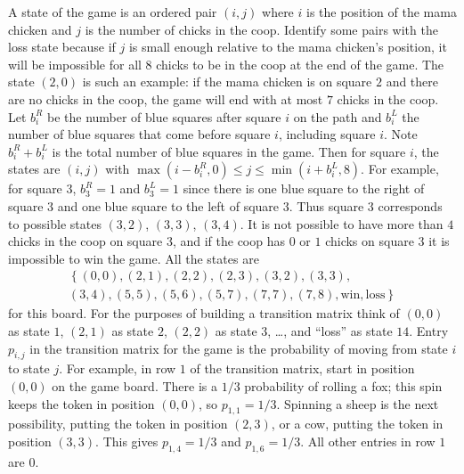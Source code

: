 \documentclass[12pt]{article}
\begin{document}
\begin{example}
    A state of the game is an ordered pair \( (i, j) \) where \( i \) is
    the position of the mama chicken and \( j \) is the number of chicks
    in the coop.  Identify some pairs with the loss state because if \(
    j \) is small enough relative to the mama chicken's position, it
    will be impossible for all \( 8 \) chicks to be in the coop at the
    end of the game.  The state \( (2, 0) \) is such an example:  if the
    mama chicken is on square \( 2 \) and there are no chicks in the
    coop, the game will end with at most \( 7 \) chicks in the coop.
    Let \( b_i^R \) be the number of blue squares after square \( i \)
    on the path and \( b_i^L \) the number of blue squares that come
    before square \( i \), including square \( i \).  Note \( b_i^R + b_i^L
    \) is the total number of blue squares in the game.  Then for square
    \( i \), the states are \( (i, j ) \) with \( \max(i - b_i^R, 0) \le
    j \le \min(i + b_i^L, 8) \).  For example, for square \( 3 \), \( b_3^R
    = 1 \) and \( b_3^L = 1 \) since there is one blue square to the
    right of square \( 3 \) and one blue square to the left of square \(
    3 \).  Thus square \( 3 \) corresponds to possible states \( (3, 2) \),
    \( (3, 3) \), \( (3, 4) \).  It is not possible to have more than \(
    4 \) chicks in the coop on square \( 3 \), and if the coop has \( 0 \)
    or \( 1 \) chicks on square \( 3 \) it is impossible to win the
    game.  All the states are
    \begin{multline*}
        \left\{(0, 0), (2, 1), (2, 2), (2, 3), (3, 2), (3, 3), \right.\\
        \left.  (3, 4), (5,5), (5, 6), (5, 7), (7, 7), (7, 8), \text{win},
        \text{loss} \right\}
    \end{multline*}
    for this board.  For the purposes of building a transition matrix
    think of \( (0, 0) \) as state \( 1 \), \( (2, 1) \) as state \( 2 \),
    \( (2, 2) \) as state \( 3 \), \dots, and ``loss'' as state \( 14 \).
    Entry \( p_{i,j} \) in the transition matrix for the game is the
    probability of moving from state \( i \) to state \( j \).  For
    example, in row \( 1 \) of the transition matrix, start in position \(
    (0, 0) \) on the game board.  There is a \( 1/3 \) probability of
    rolling a fox; this spin keeps the token in position \( (0, 0) \),
    so \( p_{1,1} = 1/3 \).  Spinning a sheep is the next possibility,
    putting the token in position \( (2, 3) \), or a cow, putting the
    token in position \( (3, 3) \).  This gives \( p_{1,4} = 1/3 \) and \(
    p_{1,6} = 1/3 \).  All other entries in row \( 1 \) are \( 0 \).

\end{example}
\end{document}
